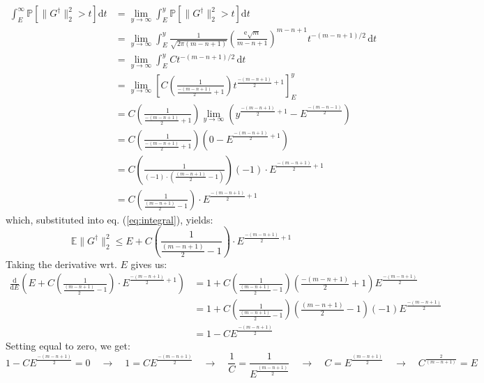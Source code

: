 \documentclass{article}
\begin{document}
\begin{align}
\int_{E}^{\infty} \mathbb{P}\left[\|G^\dag\|_2^2 > t\right] \text{d}t &= \lim_{y \rightarrow \infty} \int_{E}^{y} \mathbb{P}\left[\|G^\dag\|_2^2 > t\right] \text{d}t \\
&=  \lim_{y \rightarrow \infty} \int_{E}^{y} \frac{1}{\sqrt{2\pi(m-n+1)}}\left(\frac{\text{e} \sqrt{m}}{m-n+1}\right)^{m-n+1}t^{-(m-n+1)/2} \, \text{d} t \\
&= \lim_{y \rightarrow \infty} \int_{E}^{y} Ct^{-(m-n+1)/2} \, \text{d} t \\
&= \lim_{y \rightarrow \infty} \left[ C \left(\frac{1}{\frac{-(m-n+1)}{2}+1}\right)t^{\frac{-(m-n+1)}{2}+1}\right]_E^y \\ 
&=  C\left(\frac{1}{\frac{-(m-n+1)}{2}+1}\right) \lim_{y \rightarrow \infty} \left(y^{\frac{-(m-n+1)}{2}+1} - E^{\frac{-(m-n-1)}{2}}\right) \\
&= C\left(\frac{1}{\frac{-(m-n+1)}{2}+1}\right) \left(0 - E^{\frac{-(m-n+1)}{2}+1}\right) \\
&= C\left(\frac{1}{(-1)\cdot\left(\frac{(m-n+1)}{2}-1\right)}\right) (-1) \cdot E^{\frac{-(m-n+1)}{2}+1} \\
&= C\left(\frac{1}{\frac{(m-n+1)}{2}-1}\right) \cdot E^{\frac{-(m-n+1)}{2}+1}
\end{align}
which, substituted into eq. (\ref{eq:integral}), yields:
\begin{equation}
\mathbb{E}\|G^\dag\|_2^2 \leq E + C\left(\frac{1}{\frac{(m-n+1)}{2}-1}\right) \cdot E^{\frac{-(m-n+1)}{2}+1}
\label{eq:ineq}
\end{equation}
Taking the derivative wrt. $E$ gives us:
\begin{align}
\frac{\text{d}}{\text{d}E} \left(E + C\left(\frac{1}{\frac{(m-n+1)}{2}-1}\right) \cdot E^{\frac{-(m-n+1)}{2}+1}\right) &= 1 +  C\left(\frac{1}{\frac{(m-n+1)}{2}-1}\right) \left(\frac{-(m-n+1)}{2}+1\right)E^{\frac{-(m-n+1)}{2}} \\
&= 1 + C\left(\frac{1}{\frac{(m-n+1)}{2}-1}\right) \left(\frac{(m-n+1)}{2}-1\right) (-1)E^{\frac{-(m-n+1)}{2}} \\
&= 1 -CE^{\frac{-(m-n+1)}{2}}
\end{align}
Setting equal to zero, we get:
\begin{equation}
1 -CE^{\frac{-(m-n+1)}{2}} = 0 \quad \rightarrow \quad 1 =CE^{\frac{-(m-n+1)}{2}} \quad \rightarrow \quad \frac{1}{C} = \frac{1}{E^{\frac{(m-n+1)}{2}}} \quad \rightarrow \quad C = E^{\frac{(m-n+1)}{2}} \quad \rightarrow \quad C^{\frac{2}{(m-n+1)}} = E
\end{equation}
\end{document}
